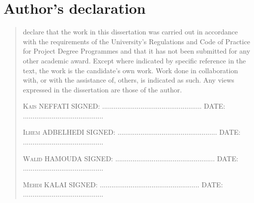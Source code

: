 %
%
%
%
%
%
\chapter*{Author's declaration}
\begin{SingleSpace}
\begin{quote}
 declare that the work in this dissertation was carried out in accordance with the requirements of  the University's Regulations and Code of Practice for Project Degree Programmes and that it  has not been submitted for any other academic award. Except where indicated by specific  reference in the text, the work is the candidate's own work. Work done in collaboration with, or with the assistance of, others, is indicated as such. Any views expressed in the dissertation are those of the author.

\vspace{1.5cm}
\noindent
\hspace{-0.75cm}\textsc{
Kais NEFFATI 
\newline
\newline
SIGNED: .................................................... DATE: ..........................................}

\vspace{1.5cm}
\noindent
\hspace{-0.75cm}\textsc{
Ilhem ADBELHEDI 
\newline
\newline
SIGNED: .................................................... DATE: ..........................................}

\vspace{1.5cm}
\noindent
\hspace{-0.75cm}\textsc{
Walid HAMOUDA 
\newline
\newline
SIGNED: .................................................... DATE: ..........................................}

\vspace{1.5cm}
\noindent
\hspace{-0.75cm}\textsc{
Mehdi KALAI 
\newline
\newline
SIGNED: .................................................... DATE: ..........................................}

\end{quote}
\end{SingleSpace}
\clearpage